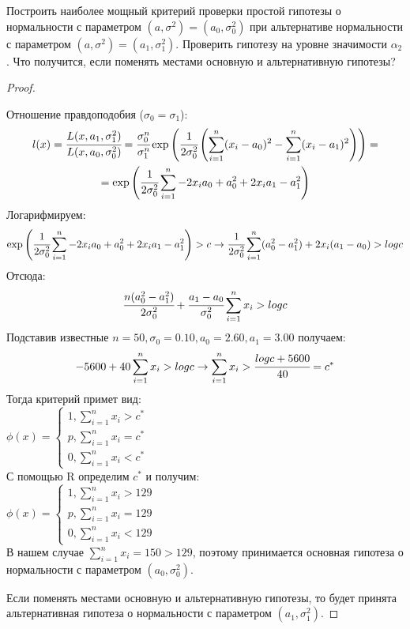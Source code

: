 \begin{problem}
	Построить наиболее мощный критерий проверки простой гипотезы о нормальности с параметром $(a, \sigma^2)=(a_0, \sigma_0^2)$ при альтернативе нормальности с параметром $(a, \sigma^2)=(a_1, \sigma_1^2)$. Проверить гипотезу на уровне значимости $\alpha_2$. Что получится, если поменять местами основную и альтернативную гипотезы?
\end{problem}

\begin{proof}
	$ $
	
	Отношение правдоподобия ($\sigma_0 = \sigma_1$):
	\begin{multline}
		l(x)=\cfrac{L(x, a_1, \sigma_1^2)}{L(x, a_0, \sigma_0^2)}=\cfrac{\sigma_0^n}{\sigma_1^n}\exp\left(\cfrac{1}{2\sigma_0^2}\left(\sum\limits_{i=1}^n(x_i-a_0)^2-\sum\limits_{i=1}^n(x_i-a_1)^2\right)\right)=\\=\exp\left(\cfrac{1}{2\sigma_0^2}\sum\limits_{i=1}^n-2x_ia_0+a_0^2+2x_ia_1-a_1^2\right)
	\end{multline}
	Логарифмируем:
	\begin{equation}
		\exp\left(\cfrac{1}{2\sigma_0^2}\sum\limits_{i=1}^n-2x_ia_0+a_0^2+2x_ia_1-a_1^2\right)>c\rightarrow \cfrac{1}{2\sigma_0^2}\sum\limits_{i=1}^n(a_0^2-a_1^2)+2x_i(a_1-a_0)>log c
	\end{equation}
	Отсюда:
	\begin{equation}
		\cfrac{n(a_0^2-a_1^2)}{2\sigma_0^2}+\cfrac{a_1-a_0}{\sigma_0^2}\sum\limits_{i=1}^nx_i>log c
	\end{equation}
	Подставив известные $n=50, \sigma_0=0.10, a_0=2.60, a_1=3.00$ получаем:
	\begin{equation}
		-5600+40\sum\limits_{i=1}^nx_i>logc\rightarrow\sum\limits_{i=1}^nx_i>\cfrac{logc+5600}{40}=c^* 
	\end{equation} 
	Тогда критерий примет вид: \\
	
	$\phi(x)=\left\{
	\begin{gathered}
		1, \sum\limits_{i=1}^nx_i>c^* \\
		p, \sum\limits_{i=1}^nx_i=c^* \\
		0, \sum\limits_{i=1}^nx_i<c^*
	\end{gathered}
	\right.$ \\
	
	С помощью R определим $c^*$ и получим: \\
	
	$\phi(x)=\left\{
	\begin{gathered}
		1, \sum\limits_{i=1}^nx_i>129 \\
		p, \sum\limits_{i=1}^nx_i=129 \\
		0, \sum\limits_{i=1}^nx_i<129
	\end{gathered}
	\right.$ \\
	
	В нашем случае $\sum\limits_{i=1}^nx_i=150>129$, поэтому принимается основная гипотеза о нормальности с параметром $(a_0, \sigma_0^2)$. 
	
	Если поменять местами основную и альтернативную гипотезы, то будет принята альтернативная гипотеза о нормальности с параметром $(a_1, \sigma_1^2)$.
\end{proof}


